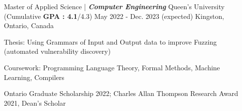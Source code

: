 

\begin{cventries}

  \cventry
    {Master of Applied Science | \textit{\textbf{Computer Engineering}}} %
    {Queen's University {\normalfont (\normalsize{Cumulative \textbf{GPA : 4.1}/4.3})}} %
    {May 2022 - Dec. 2023 (expected)} %
    {Kingston, Ontario, Canada} %
    {
    \begin{cvitems} %
        \item {Thesis: Using Grammars of Input and Output data to improve Fuzzing (automated vulnerability discovery)}
        \item {Coursework: Programming Language Theory, Formal Methods, Machine Learning, Compilers}
        \item{Ontario Graduate Scholarship 2022; Charles Allan Thompson Research Award 2021, Dean's Scholar}
      \end{cvitems}
    }


\end{cventries}
